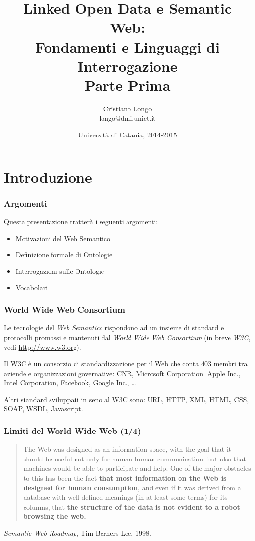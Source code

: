 \documentclass[8pt]{beamer}
\title{Linked Open Data e Semantic Web:\\
Fondamenti e Linguaggi di Interrogazione\\
Parte Prima}
\author{Cristiano Longo\\ 
{\small{longo@dmi.unict.it}}}
\date{Universit\`a di Catania, 2014-2015}
\begin{document}
\maketitle
\setcounter{tocdepth}{1}

\section{Introduzione}

\begin{frame}
\frametitle{Argomenti}
Questa presentazione tratter\`a i seguenti argomenti:
\begin{itemize}
 \item Motivazioni del Web Semantico
 \item Definizione formale di Ontologie
 \item Interrogazioni sulle Ontologie
 \item Vocabolari
\end{itemize}
\end{frame}

\begin{frame}
\frametitle{World Wide Web Consortium}
Le tecnologie del \emph{Web Semantico} rispondono ad un insieme di
standard e protocolli promossi e mantenuti dal \emph{World Wide Web Consortium} 
(in breve \emph{W3C}, vedi \url{http://www.w3.org}).
\vspace{\baselineskip}

Il W3C \`e un consorzio di standardizzazione per il Web che
conta 403 membri tra aziende e organizzazioni governative: CNR,
Microsoft Corporation, Apple Inc., Intel Corporation, Facebook, Google Inc., \ldots
\vspace{\baselineskip}

Altri standard sviluppati in seno al W3C sono: URL, HTTP, XML, HTML, CSS, SOAP, 
WSDL, Javascript. 
\end{frame}

\begin{frame}
\frametitle{Limiti del World Wide Web (1/4)}
\begin{quote}
The Web was designed as an information space, with the goal that it should be 
useful not only for human-human communication, but also that machines would be
able to participate and help. One of the major obstacles to this has been the
fact \textbf{that most information on the Web is designed for human consumption}, and 
even if it was derived from a database with well defined meanings (in at least 
some terms) for its columns, that \textbf{the structure of the data is not evident to 
a robot browsing the web.}  
\end{quote}
\vspace{\baselineskip}
\emph{Semantic Web Roadmap}, Tim Berners-Lee, 1998.
\end{frame}
\end{document}
